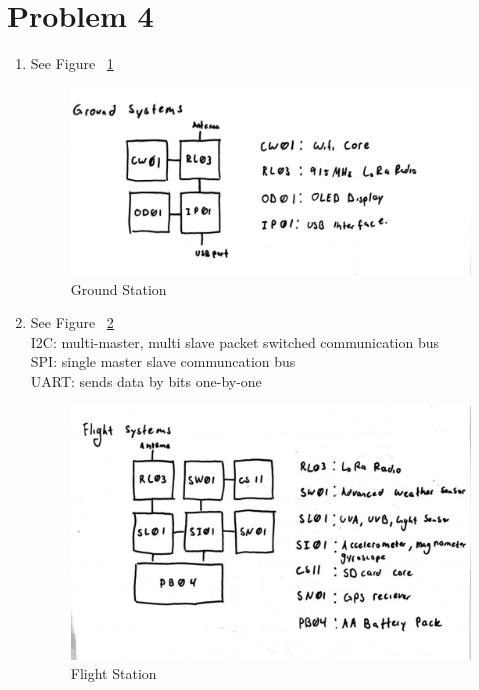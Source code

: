 \documentclass{article}
\begin{document}
\section*{Problem 4}
\begin{enumerate}[label=(\alph*)]
	\item See Figure ~\ref{G}
	\begin{figure}[H]
		\centering
		\includegraphics[width=5in]{images/Ground_station.jpg}
		\caption{Ground Station}
		\label{G}
	\end{figure}
	\item See Figure ~\ref{F}\\
	I2C:  multi-master, multi slave packet switched communication bus\\
	SPI:  single master slave communcation bus\\
	UART: sends data by bits one-by-one
	\begin{figure}[H]
		\centering
		\includegraphics[width=5in]{images/Flight_station.jpg}
		\caption{Flight Station}
		\label{F}
	\end{figure}
\end{enumerate}
\end{document}
